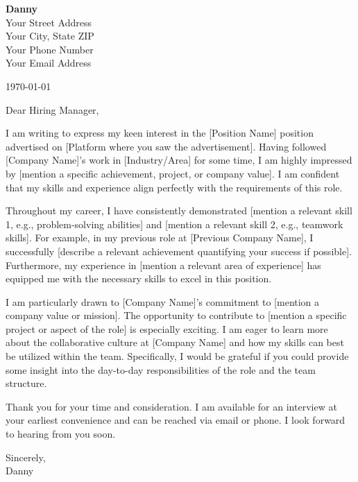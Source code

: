 \documentclass[letterpaper,11pt]{article}
\begin{document}
\textbf{Danny} \\
Your Street Address \\
Your City, State ZIP \\
Your Phone Number \\
Your Email Address \\
\vspace{20pt}

\today \\
\vspace{20pt}

Dear Hiring Manager, \\
\vspace{10pt}

I am writing to express my keen interest in the [Position Name] position advertised on [Platform where you saw the advertisement].  Having followed [Company Name]'s work in [Industry/Area] for some time, I am highly impressed by [mention a specific achievement, project, or company value].  I am confident that my skills and experience align perfectly with the requirements of this role.


\vspace{10pt}

Throughout my career, I have consistently demonstrated [mention a relevant skill 1, e.g., problem-solving abilities] and [mention a relevant skill 2, e.g., teamwork skills]. For example, in my previous role at [Previous Company Name], I successfully [describe a relevant achievement quantifying your success if possible].  Furthermore, my experience in [mention a relevant area of experience] has equipped me with the necessary skills to excel in this position.


\vspace{10pt}

I am particularly drawn to [Company Name]'s commitment to [mention a company value or mission].  The opportunity to contribute to [mention a specific project or aspect of the role] is especially exciting. I am eager to learn more about the collaborative culture at [Company Name] and how my skills can best be utilized within the team.  Specifically, I would be grateful if you could provide some insight into the day-to-day responsibilities of the role and the team structure.


\vspace{10pt}

Thank you for your time and consideration. I am available for an interview at your earliest convenience and can be reached via email or phone.  I look forward to hearing from you soon.


\vspace{20pt}

Sincerely, \\
\vspace{40pt}
Danny
\end{document}
